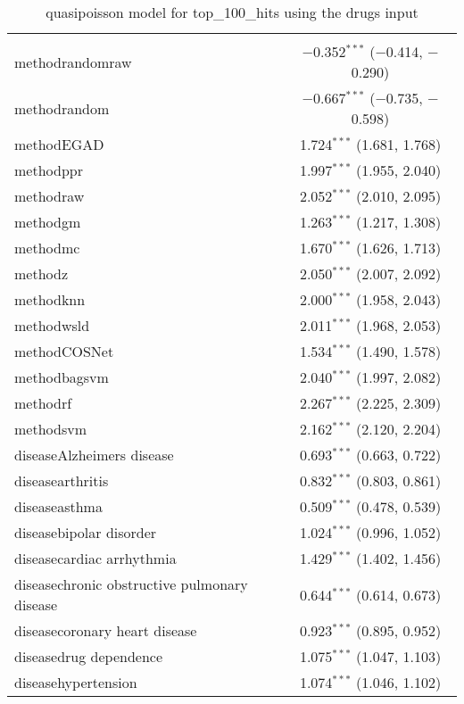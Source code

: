 
\begin{table}[!htbp] \centering 
  \caption{quasipoisson model for top_100_hits using the drugs input} 
  \label{} 
\begin{tabular}{@{\extracolsep{5pt}}lc} 
\\[-1.8ex]\hline 
\hline \\[-1.8ex] 
 methodrandomraw & $-$0.352$^{***}$ ($-$0.414, $-$0.290) \\ 
  methodrandom & $-$0.667$^{***}$ ($-$0.735, $-$0.598) \\ 
  methodEGAD & 1.724$^{***}$ (1.681, 1.768) \\ 
  methodppr & 1.997$^{***}$ (1.955, 2.040) \\ 
  methodraw & 2.052$^{***}$ (2.010, 2.095) \\ 
  methodgm & 1.263$^{***}$ (1.217, 1.308) \\ 
  methodmc & 1.670$^{***}$ (1.626, 1.713) \\ 
  methodz & 2.050$^{***}$ (2.007, 2.092) \\ 
  methodknn & 2.000$^{***}$ (1.958, 2.043) \\ 
  methodwsld & 2.011$^{***}$ (1.968, 2.053) \\ 
  methodCOSNet & 1.534$^{***}$ (1.490, 1.578) \\ 
  methodbagsvm & 2.040$^{***}$ (1.997, 2.082) \\ 
  methodrf & 2.267$^{***}$ (2.225, 2.309) \\ 
  methodsvm & 2.162$^{***}$ (2.120, 2.204) \\ 
  diseaseAlzheimers disease & 0.693$^{***}$ (0.663, 0.722) \\ 
  diseasearthritis & 0.832$^{***}$ (0.803, 0.861) \\ 
  diseaseasthma & 0.509$^{***}$ (0.478, 0.539) \\ 
  diseasebipolar disorder & 1.024$^{***}$ (0.996, 1.052) \\ 
  diseasecardiac arrhythmia & 1.429$^{***}$ (1.402, 1.456) \\ 
  diseasechronic obstructive pulmonary disease & 0.644$^{***}$ (0.614, 0.673) \\ 
  diseasecoronary heart disease & 0.923$^{***}$ (0.895, 0.952) \\ 
  diseasedrug dependence & 1.075$^{***}$ (1.047, 1.103) \\ 
  diseasehypertension & 1.074$^{***}$ (1.046, 1.102) \\ 

\end{tabular}
\end{table}
